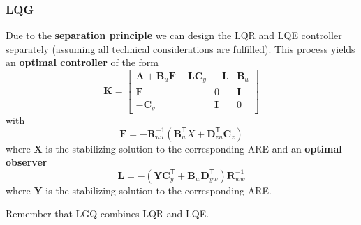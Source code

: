 \subsubsection{LQG}
Due to the \textbf{separation principle} we can design the LQR and LQE controller separately (assuming all technical considerations are fulfilled). This process yields an \textbf{optimal controller} of the form
\begin{equation*}
    \mathbf{K}=\left[\begin{array}{c|cc}%
            \mathbf{A}+\mathbf{B}_u \mathbf{F}+\mathbf{L}\mathbf{C}_y & -\mathbf{L} & \mathbf{B}_u \\
            \hline  %
            \mathbf{F}                                                & 0           & \mathbf{I}   \\
            -\mathbf{C}_y                                             & \mathbf{I}  & 0
        \end{array}\right]
\end{equation*}
with
\begin{equation*}
    \mathbf{F}=-\mathbf{R}_{uu}^{-1}(\mathbf{B}_{u}^{\mathsf{T}}X+\mathbf{D}_{zu}^{\mathsf{T}}\mathbf{C}_{z})
\end{equation*}
where $\mathbf{X}$ is the stabilizing solution to the corresponding ARE and an \textbf{optimal observer}
\begin{equation*}
    \mathbf{L}=-(\mathbf{Y}\mathbf{C}_y^{\mathsf{T}}+\mathbf{B}_w \mathbf{D}_{yw}^{\mathsf{T}})\mathbf{R}_{ww}^{-1}
\end{equation*}
where $\mathbf{Y}$ is the stabilizing solution to the corresponding ARE.

\newpar{}

Remember that LGQ combines LQR and LQE.


